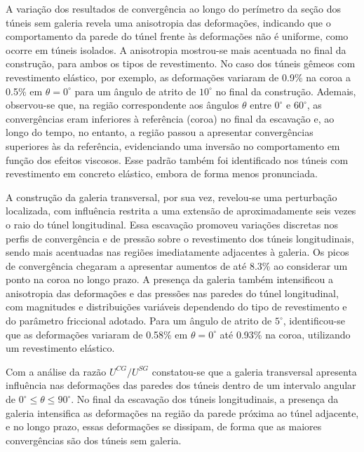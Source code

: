 A variação dos resultados de convergência ao longo do perímetro da seção dos túneis sem galeria revela uma anisotropia das deformações, indicando que o comportamento da parede do túnel frente às deformações não é uniforme, como ocorre em túneis isolados. A anisotropia mostrou-se mais acentuada no final da construção, para ambos os tipos de revestimento. No caso dos túneis gêmeos com revestimento elástico, por exemplo, as deformações variaram de 0.9\% na coroa a 0.5\% em $\theta=0^\circ$ para um ângulo de atrito de $10^\circ$ no final da construção. Ademais, observou-se que, na região correspondente aos ângulos $\theta$ entre $0^\circ$ e $60^\circ$, as convergências eram inferiores à referência (coroa) no final da escavação e, ao longo do tempo, no entanto, a região passou a apresentar convergências superiores às da referência, evidenciando uma inversão no comportamento em função dos efeitos viscosos. Esse padrão também foi identificado nos túneis com revestimento em concreto elástico, embora de forma menos pronunciada.

A construção da galeria transversal, por sua vez, revelou-se uma perturbação localizada, com influência restrita a uma extensão de aproximadamente seis vezes o raio do túnel longitudinal. Essa escavação promoveu variações discretas nos perfis de convergência e de pressão sobre o revestimento dos túneis longitudinais, sendo mais acentuadas nas regiões imediatamente adjacentes à galeria. Os picos de convergência chegaram a apresentar aumentos de até 8.3\% ao considerar um ponto na coroa no longo prazo. A presença da galeria também intensificou a anisotropia das deformações e das pressões nas paredes do túnel longitudinal, com magnitudes e distribuições variáveis dependendo do tipo de revestimento e do parâmetro friccional adotado. Para um ângulo de atrito de $5^\circ$, identificou-se que as deformações variaram de 0.58\% em $\theta=0^\circ$ até 0.93\% na coroa, utilizando um revestimento elástico.

Com a análise da razão $U^{CG}/U^{SG}$ constatou-se que a galeria transversal apresenta influência nas deformações das paredes dos túneis dentro de um intervalo angular de $0^\circ \leq \theta \leq 90^\circ$. No final da escavação dos túneis longitudinais, a presença da galeria intensifica as deformações na região da parede próxima ao túnel adjacente, e no longo prazo, essas deformações se dissipam, de forma que as maiores convergências são dos túneis sem galeria.

